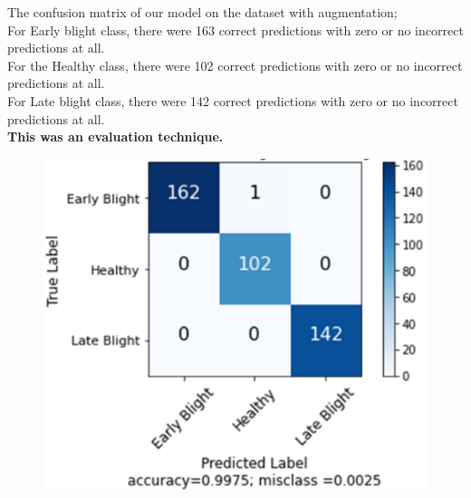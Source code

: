 \documentclass[11pt]{report}
\begin{document}
The confusion matrix of our model on the dataset with augmentation;\\
For Early blight class, there were 163 correct predictions with zero or no incorrect predictions at all.\\
For the Healthy class, there were 102 correct predictions with zero or no incorrect predictions at all.\\
For Late blight class, there were 142 correct predictions with zero or no incorrect predictions at all.\\
\textbf{This was an evaluation technique.}\\
\begin{figure}[h]
	\centerline{\small 
		\includegraphics[height=0.25\textheight]  {p7}}
\end{figure}
\end{document}
